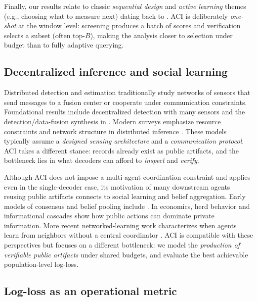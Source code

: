\documentclass[twocolumn]{scholar7}
\begin{document}
Finally, our results relate to classic \emph{sequential design} and \emph{active learning} themes
(e.g., choosing what to measure next) dating back to \citep{chernoff1959}.
ACI is deliberately \emph{one-shot} at the window level:
screening produces a batch of scores and verification selects a subset (often top-$B$),
making the analysis closer to selection under budget than to fully adaptive querying.

\subsection{Decentralized inference and social learning}

Distributed detection and estimation traditionally study networks of sensors that send messages to a fusion center or cooperate under communication constraints.
Foundational results include decentralized detection with many sensors \citep{tsitsiklis1988decentralized} and the detection/data-fusion synthesis in \citep{varshney1997distributed}.
Modern surveys emphasize resource constraints and network structure in distributed inference \citep{veeravalli2012distributed}.
These models typically assume a \emph{designed sensing architecture} and a \emph{communication protocol}.
ACI takes a different stance:
records already exist as public artifacts, and the bottleneck lies in what decoders can afford to \emph{inspect} and \emph{verify}.

Although ACI does not impose a multi-agent coordination constraint and applies even in the single-decoder case, its motivation of many downstream agents reusing public artifacts connects to social learning and belief aggregation.
Early models of consensus and belief pooling include \citep{degroot1974}.
In economics, herd behavior and informational cascades \citep{banerjee1992,bikhchandani1992} show how public actions can dominate private information.
More recent networked-learning work characterizes when agents learn from neighbors without a central coordinator \citep{jadbabaie2012nonbayesian}.
ACI is compatible with these perspectives but focuses on a different bottleneck:
we model the \emph{production of verifiable public artifacts} under shared budgets, and evaluate the best achievable population-level log-loss.

\subsection{Log-loss as an operational metric}
\end{document}
